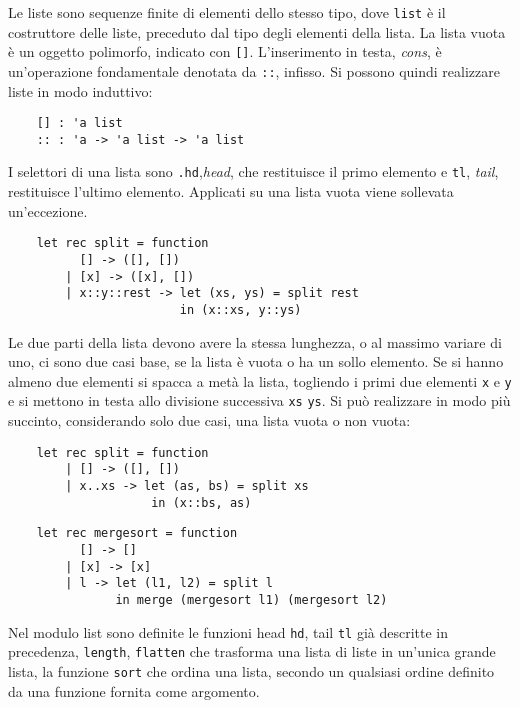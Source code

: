 \documentclass{article}
\numberwithin{equation}{subsection}
\begin{document}







Le liste sono sequenze finite di elementi dello stesso tipo, dove \verb|list| è il costruttore delle liste, preceduto dal tipo degli elementi della lista. La lista vuota è un oggetto polimorfo, indicato con \verb|[]|. L'inserimento in testa, \textit{cons}, è un'operazione fondamentale denotata da \verb|::|, infisso. Si possono quindi realizzare liste in modo induttivo:
\begin{verbatim}
    [] : 'a list
    :: : 'a -> 'a list -> 'a list 
\end{verbatim}
I selettori di una lista sono \verb|.hd|,\textit{head}, che restituisce il primo elemento e \verb|tl|, \textit{tail}, restituisce l'ultimo elemento. Applicati su una lista vuota viene sollevata un'eccezione. 



\begin{verbatim}
    let rec split = function
          [] -> ([], [])
        | [x] -> ([x], [])
        | x::y::rest -> let (xs, ys) = split rest
                        in (x::xs, y::ys)
\end{verbatim}
Le due parti della lista devono avere la stessa lunghezza, o al massimo variare di uno, ci sono due casi base, se la lista è vuota o ha un sollo elemento. Se si hanno almeno due elementi si spacca a metà la lista, togliendo i primi due elementi \verb|x| e \verb|y| e si mettono in testa allo divisione successiva \verb|xs| \verb|ys|. 
Si può realizzare in modo più succinto, considerando solo due casi, una lista vuota o non vuota:
\begin{verbatim}
    let rec split = function
        | [] -> ([], [])
        | x..xs -> let (as, bs) = split xs
                    in (x::bs, as)
\end{verbatim}

\begin{verbatim}
    let rec mergesort = function
          [] -> []
        | [x] -> [x]
        | l -> let (l1, l2) = split l
               in merge (mergesort l1) (mergesort l2)
\end{verbatim}
Nel modulo list sono definite le funzioni head \verb|hd|, tail \verb|tl| già descritte in precedenza, \verb|length|, \verb|flatten| che trasforma una lista di liste in un'unica grande lista, la funzione \verb|sort| che ordina una lista, secondo un qualsiasi ordine definito da una funzione fornita come argomento. 
\end{document}

